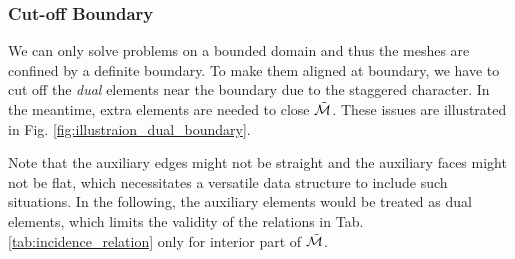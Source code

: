\documentclass{article}
\begin{document}
\subsubsection{Cut-off Boundary}
We can only solve problems on a bounded domain and thus the meshes are confined by a definite boundary. To make them aligned at boundary, we have to cut off the \emph{dual} elements near the boundary due to the staggered character. In the meantime, extra elements are needed to close $\Tilde{\mathcal{M}}$. These issues are illustrated in Fig. \ref{fig:illustraion_dual_boundary}.

Note that the auxiliary edges might not be straight and the auxiliary faces might not be flat, which necessitates a versatile data structure to include such situations. In the following, the auxiliary elements would be treated as dual elements, which limits the validity of the relations in Tab. \ref{tab:incidence_relation} only for interior part of $\Tilde{\mathcal{M}}$.
\end{document}
